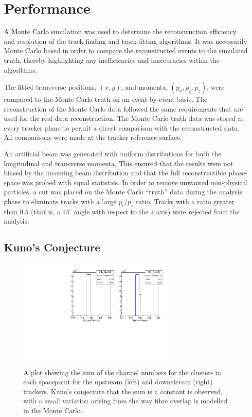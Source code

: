 \section{Performance}
\label{sec:Performance}

  A Monte Carlo simulation was used to determine the reconstruction efficiency and resolution of the track-finding and track-fitting algorithms. It was necessarily Monte Carlo based in order to compare the reconstructed events to the simulated truth, thereby highlighting any inefficiencies and inaccuracies within the algorithms.

  The fitted transverse positions, $(x,y)$, and momenta, $(p_x, p_y, p_z)$, were compared to the Monte Carlo truth on an event-by-event basis. The reconstruction of the Monte Carlo data followed the same requirements that are used for the real-data reconstruction. The Monte Carlo truth data was stored at every tracker plane to permit a direct comparison with the reconstructed data. All comparisons were made at the tracker reference surface. %

  An artificial beam was generated with uniform distributions for both the longitudinal and transverse momenta. This ensured that the results were not biased by the incoming beam distribution and that the full reconstructible phase-space was probed with equal statistics. In order to remove unwanted non-physical particles, a cut was placed on the Monte Carlo ``truth'' data during the analysis phase to eliminate tracks with a large $p_t/p_z$ ratio. Tracks with a ratio greater than $0.5$ (that is, a $45^\circ$ angle with respect to the $z$ axis) were rejected from the analysis.
  
  \subsection{Kuno's Conjecture}
  \label{sec:performance:kunos_conjecture}
  
  \begin{figure}[tb]
     \centering
     \includegraphics[width=0.7\textwidth, angle=0]{08-Performance/Kuno6mm.pdf}
     \caption{\label{fig:kuno} A plot showing the sum of the channel numbers for the clusters in each spacepoint for the upstream (left) and downstream (right) trackers. Kuno's conjecture that the sum is a constant is observed, with a small variation arising from the way fibre overlap is modelled in the Monte Carlo.}
    \end{figure}
  
